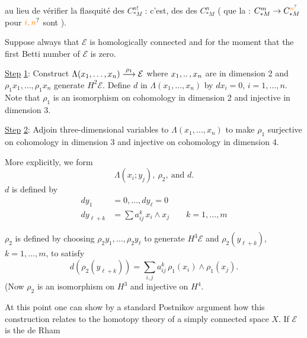  au lieu de vérifier la flasquité des $C_{*M}^{n!}$ : c'est,    des  des $C_{*M}^n$ ( que la    : $C_{*M}^m\to C_{*M}^{\unsure{n}}$ pour $\unsure{i,n}$ sont ).

Suppose always that $\mathcal{E}$ is homologically connected and for the moment that the first Betti number of $\mathcal{E}$ is zero.

\uline{Step} \uline{1}: Construct $\Lambda(x_1,\ldots,x_n)\mathrel{\overset{\rho_1}{\longrightarrow}}\mathcal{E}$ where $x_1,\mathinner{..},x_n$ are in dimension 2 and $\rho_1x_1,\ldots,\rho_1x_n$ generate $H^2\mathcal{E}$. Define $d$ in $\Lambda(x_1,\ldots,x_n)$ by $dx_i=0$, $i=1,\ldots,n$. Note that $\rho_1$ is an isomorphism on cohomology in dimension 2 and injective in dimension 3.

\uline{Step} \uline{2}: Adjoin three-dimensional variables to $\Lambda(x_1,\ldots,x_n)$ to make $\rho_1$ surjective on cohomology in dimension 3 and injective on cohomology in dimension 4.

More explicitly, we form
\[
 \Lambda(x_i;y_j),\ \rho_2,\ \text{and }d.
\]
$d$ is defined by
\[
\begin{aligned}
 dy_1&=0,\ldots,dy_\ell=0\\
 dy_{\ell+k}&=\sum a_{ij}^k\,x_i\wedge x_j\qquad k=1,\ldots,m
\end{aligned}
\]

$\rho_2$ is defined by choosing $\rho_2y_1,\ldots,\rho_2y_\ell$ to generate $H^3\mathcal{E}$ and $\rho_2(y_{\ell+k})$, $k=1,\ldots,m$, to satisfy
\[
 d(\rho_2(y_{\ell+k}))=\sum_{i,j}a_{ij}^k\,\rho_1(x_i)\wedge\rho_1(x_j).
\]
(Now $\rho_2$ is an isomorphism on $H^3$ and injective on $H^4$.

At this point one can show by a standard Postnikov argument how this construction relates to the homotopy theory of a simply connected space $X$. If $\mathcal{E}$ is the de Rham

